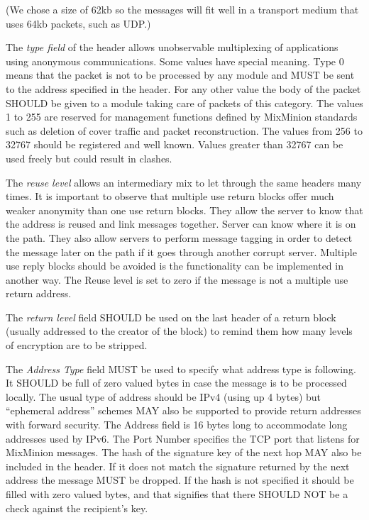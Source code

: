 \documentclass{article}
\begin{document}
(We chose a size of 62kb so the messages will fit well in a transport
medium that uses 64kb packets, such as UDP.)

% 

The \emph{type field} of the header allows unobservable multiplexing of
applications using anonymous communications. Some values have special
meaning. Type 0 means that the packet is not to be processed by any
module and MUST be sent to the address specified in the header. For
any other value the body of the packet SHOULD be given to a module taking
care of packets of this category. The values 1 to 255 are reserved for
management functions defined by MixMinion standards such as deletion
of cover traffic and packet reconstruction. The values from 256 to
32767 should be registered and well known. Values greater than 32767
can be used freely but could result in clashes.

The \emph{reuse level} allows an intermediary mix to let through the same
headers many times. It is important to observe that multiple use
return blocks offer much weaker anonymity than one use return
blocks. They allow the server to know that the address is reused and
link messages together. Server can know where it is on the path. They
also allow servers to perform message tagging in order to detect the
message later on the path if it goes through another corrupt
server. Multiple use reply blocks should be avoided is the
functionality can be implemented in another way. The Reuse level is
set to zero if the message is not a multiple use return address.

The \emph{return level} field SHOULD be used on the last header of a
return block (usually addressed to the creator of the block) to remind
them how many levels of encryption are to be stripped.

The \emph{Address Type} field MUST be used to specify what address type is
following. It SHOULD be full of zero valued bytes in case the message
is to be processed locally. The usual type of address should be IPv4
(using up 4 bytes) but ``ephemeral address'' schemes MAY also be
supported to provide return addresses with forward security. The
Address field is 16 bytes long to accommodate long addresses used by
IPv6. The Port Number specifies the TCP port that listens for
MixMinion messages. The hash of the signature key of the next hop MAY
also be included in the header. If it does not match the signature
returned by the next address the message MUST be dropped. If the hash
is not specified it should be filled with zero valued bytes, and that
signifies that there SHOULD NOT be a check against the recipient's key.
\end{document}
